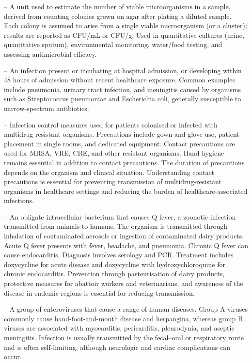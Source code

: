 -- A unit used to estimate the number of viable microorganisms in a sample, derived from counting colonies grown on agar after plating a diluted sample. Each colony is assumed to arise from a single viable microorganism (or a cluster); results are reported as CFU/mL or CFU/g. Used in quantitative cultures (urine, quantitative sputum), environmental monitoring, water/food testing, and assessing antimicrobial efficacy.

-- An infection present or incubating at hospital admission, or developing within 48 hours of admission without recent healthcare exposure. Common examples include pneumonia, urinary tract infection, and meningitis caused by organisms such as Streptococcus pneumoniae and Escherichia coli, generally susceptible to narrow-spectrum antibiotics.

-- Infection control measures used for patients colonised or infected with multidrug-resistant organisms. Precautions include gown and glove use, patient placement in single rooms, and dedicated equipment. Contact precautions are used for MRSA, VRE, CRE, and other resistant organisms. Hand hygiene remains essential in addition to contact precautions. The duration of precautions depends on the organism and clinical situation. Understanding contact precautions is essential for preventing transmission of multidrug-resistant organisms in healthcare settings and reducing the burden of healthcare-associated infections.

-- An obligate intracellular bacterium that causes Q fever, a zoonotic infection transmitted from animals to humans. The organism is transmitted through inhalation of contaminated aerosols or ingestion of contaminated dairy products. Acute Q fever presents with fever, headache, and pneumonia. Chronic Q fever can cause endocarditis. Diagnosis involves serology and PCR. Treatment includes doxycycline for acute disease and doxycycline with hydroxychloroquine for chronic endocarditis. Prevention through pasteurisation of dairy products, protective measures for abattoir workers and veterinarians, and awareness of the disease in endemic regions is essential for reducing transmission.

-- A group of enteroviruses that cause a range of human diseases. Group A viruses commonly cause hand-foot-and-mouth disease and herpangina, whereas group B viruses are associated with myocarditis, pericarditis, pleurodynia, and aseptic meningitis. Infection is usually transmitted by the fecal--oral or respiratory route and is often self-limiting, although neurologic and cardiac complications can occur.

